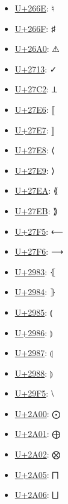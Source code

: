 \begin{itemize}
	\item \href{https://www.compart.com/en/unicode/U+266E}{U+266E}: ♮
	\item \href{https://www.compart.com/en/unicode/U+266F}{U+266F}: ♯
	\item \href{https://www.compart.com/en/unicode/U+26A0}{U+26A0}: ⚠
	\item \href{https://www.compart.com/en/unicode/U+2713}{U+2713}: ✓
	\item \href{https://www.compart.com/en/unicode/U+27C2}{U+27C2}: ⟂
	\item \href{https://www.compart.com/en/unicode/U+27E6}{U+27E6}: ⟦
	\item \href{https://www.compart.com/en/unicode/U+27E7}{U+27E7}: ⟧
	\item \href{https://www.compart.com/en/unicode/U+27E8}{U+27E8}: ⟨
	\item \href{https://www.compart.com/en/unicode/U+27E9}{U+27E9}: ⟩
	\item \href{https://www.compart.com/en/unicode/U+27EA}{U+27EA}: ⟪
	\item \href{https://www.compart.com/en/unicode/U+27EB}{U+27EB}: ⟫
	\item \href{https://www.compart.com/en/unicode/U+27F5}{U+27F5}: ⟵
	\item \href{https://www.compart.com/en/unicode/U+27F6}{U+27F6}: ⟶
	\item \href{https://www.compart.com/en/unicode/U+2983}{U+2983}: ⦃
	\item \href{https://www.compart.com/en/unicode/U+2984}{U+2984}: ⦄
	\item \href{https://www.compart.com/en/unicode/U+2985}{U+2985}: ⦅
	\item \href{https://www.compart.com/en/unicode/U+2986}{U+2986}: ⦆
	\item \href{https://www.compart.com/en/unicode/U+2987}{U+2987}: ⦇
	\item \href{https://www.compart.com/en/unicode/U+2988}{U+2988}: ⦈
	\item \href{https://www.compart.com/en/unicode/U+29F5}{U+29F5}: ⧵
	\item \href{https://www.compart.com/en/unicode/U+2A00}{U+2A00}: ⨀
	\item \href{https://www.compart.com/en/unicode/U+2A01}{U+2A01}: ⨁
	\item \href{https://www.compart.com/en/unicode/U+2A02}{U+2A02}: ⨂
	\item \href{https://www.compart.com/en/unicode/U+2A05}{U+2A05}: ⨅
	\item \href{https://www.compart.com/en/unicode/U+2A06}{U+2A06}: ⨆

\end{itemize}
